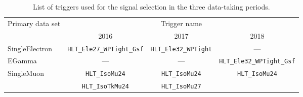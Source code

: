 \begin{table}[h]
  \begin{center}
    \caption{\label{tab:sgnlTriggers} List of triggers used for the
      signal selection in the three data-taking periods.}
      \begin{tabular}{|l|c|c|c|}
      \hline
      \multirow{2}{*}{Primary data set} & \multicolumn{3}{|c|}{Trigger name}\\
      \cline{2-4}
      & 2016 & 2017 & 2018 \\
      \hline\hline
      SingleElectron & \texttt{\scriptsize HLT\_Ele27\_WPTight\_Gsf} & \texttt{\scriptsize HLT\_Ele32\_WPTight} & --- \\
      \hline
      EGamma         & --- & --- & \texttt{\scriptsize HLT\_Ele32\_WPTight\_Gsf} \\
      \hline
      \multirow{2}{*}{SingleMuon} & \texttt{\scriptsize HLT\_IsoMu24} & \texttt{\scriptsize HLT\_IsoMu24} & \multirow{2}{*}{\texttt{\scriptsize HLT\_IsoMu24}} \\
      & \texttt{\scriptsize HLT\_IsoTkMu24} & \texttt{\scriptsize HLT\_IsoMu27} & \\
      \hline
    \end{tabular}    
  \end{center}
\end{table}

